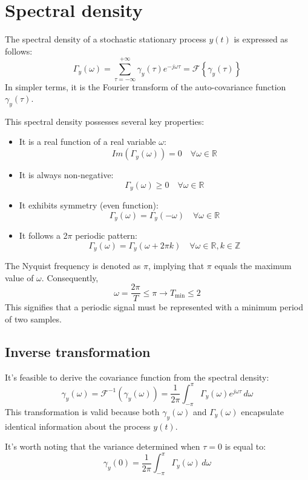 \section{Spectral density}

The spectral density of a stochastic stationary process $y(t)$ is expressed as follows:
\[\Gamma_y(\omega)=\sum_{\tau=-\infty}^{+\infty}\gamma_y(\tau)e^{-j\omega\tau}=\mathcal{F}\left\{ \gamma_y(\tau) \right\}\]
In simpler terms, it is the Fourier transform of the auto-covariance function $\gamma_y(\tau)$.

This spectral density possesses several key properties:
\begin{itemize}
    \item It is a real function of a real variable $\omega$:
        \[Im(\Gamma_y(\omega))=0\quad\forall\omega\in\mathbb{R}\]
    \item It is always non-negative:
        \[\Gamma_y(\omega) \geq 0\quad\forall\omega\in\mathbb{R}\]
    \item It exhibits symmetry (even function):
        \[\Gamma_y(\omega)=\Gamma_y(-\omega)\quad\forall\omega\in\mathbb{R}\] 
    \item It follows a 2$\pi$ periodic pattern: 
        \[\Gamma_y(\omega)=\Gamma_y(\omega+2\pi k)\quad\forall\omega\in\mathbb{R},k\in\mathbb{Z}\]
\end{itemize}
The Nyquist frequency is denoted as $\pi$, implying that $\pi$ equals the maximum value of $\omega$. 
Consequently,
\[\omega=\dfrac{2\pi}{T} \leq \pi \rightarrow T_{\min}\leq 2\]
This signifies that a periodic signal must be represented with a minimum period of two samples.

\subsection{Inverse transformation}
It's feasible to derive the covariance function from the spectral density:
\[\gamma_y(\omega)=\mathcal{F}^{-1}\left(\gamma_y(\omega)\right)=\dfrac{1}{2\pi}\int_{-\pi}^{\pi}\Gamma_y(\omega)e^{j\omega\tau}\,d\omega\]
This transformation is valid because both $\gamma_y(\omega)$ and $\Gamma_y(\omega)$ encapsulate identical information about the process $y(t)$.

It's worth noting that the variance determined when $\tau=0$ is equal to:
\[\gamma_y(0)=\dfrac{1}{2\pi}\int_{-\pi}^{\pi}\Gamma_y(\omega)\,d\omega\]